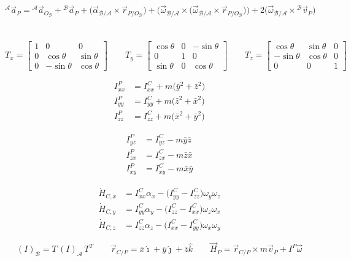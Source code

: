 \documentclass{article}
\begin{document}
\[
{}^\mathcal A\vec a_P={}^\mathcal A\vec a_{O_\mathcal B}+{}^\mathcal B\vec a_P+\bigl(\vec\alpha_{\mathcal B/\mathcal A}\times\vec r_{P/O_\mathcal B}\bigr)+\bigl(\vec\omega_{\mathcal B/\mathcal A}\times\bigl(\vec\omega_{\mathcal B/\mathcal A}\times\vec r_{P/O_\mathcal B}\bigr)\bigr)+2\bigl(\vec\omega_{\mathcal B/\mathcal A}\times{}^\mathcal B\vec v_P\bigr)
\]

\section*{}

\[
T_x=
\begin{bmatrix}
1 & 0 & 0 \\
0 & \cos\theta & \sin\theta \\
0 & -\sin\theta & \cos\theta
\end{bmatrix}
\qquad
T_y=
\begin{bmatrix}
\cos\theta & 0 & -\sin\theta \\
0 & 1 & 0 \\
\sin\theta & 0 & \cos\theta
\end{bmatrix}
\qquad
T_z=
\begin{bmatrix}
\cos\theta & \sin\theta & 0 \\
-\sin\theta & \cos\theta & 0 \\
0 & 0 & 1
\end{bmatrix}
\]

\begin{multicols}{3}

\[
\begin{split}
    I_{xx}^P&=I_{xx}^C+m\bigl(\bar y^2+\bar z^2\bigr) \\
    I_{yy}^P&=I_{yy}^C+m\bigl(\bar z^2+\bar x^2\bigr) \\
    I_{zz}^P&=I_{zz}^C+m\bigl(\bar x^2+\bar y^2\bigr)
\end{split}
\]

\columnbreak

\[
\begin{split}
    I_{yz}^P&=I_{yz}^C-m\bar y\bar z \\
    I_{zx}^P&=I_{zx}^C-m\bar z\bar x \\
    I_{xy}^P&=I_{xy}^C-m\bar x\bar y
\end{split}
\]

\columnbreak

\[
\begin{split}
    \dot H_{C,x}&=I_{xx}^C\alpha_x-\bigl(I_{yy}^C-I_{zz}^C\bigr)\omega_y\omega_z \\
    \dot H_{C,y}&=I_{yy}^C\alpha_y-\bigl(I_{zz}^C-I_{xx}^C\bigr)\omega_z\omega_x \\
    \dot H_{C,z}&=I_{zz}^C\alpha_z-\bigl(I_{xx}^C-I_{yy}^C\bigr)\omega_x\omega_y
\end{split}
\]

\end{multicols}

\[
(I)_\mathcal B=T\,(I)_\mathcal A\,T^T \qquad
\vec r_{C/P}=\bar x\hat\imath+\bar y\hat\jmath+\bar z\hat k \qquad
\vec H_P=\vec r_{C/P}\times m\vec v_P+I^P\vec\omega
\]
\end{document}

